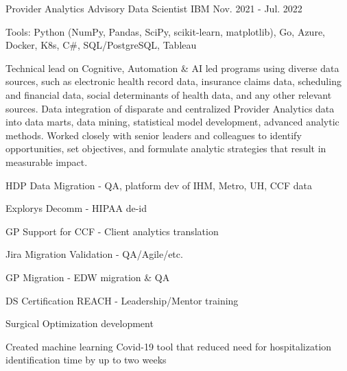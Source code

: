 \begin{cventries}
  \cvexpentry
    {Provider Analytics} %
    {Advisory Data Scientist} %
    {IBM}
    {Nov. 2021 - Jul. 2022}
    {
      \begin{cvheavyparagraph}
        Tools: Python (NumPy, Pandas, SciPy, scikit-learn, matplotlib), Go, Azure, Docker, K8s, C\#, SQL/PostgreSQL, Tableau
      \end{cvheavyparagraph}
    }
    {
      \begin{cvparagraph}
        Technical lead on Cognitive, Automation \& AI led programs using diverse data sources, such as electronic health record data, insurance claims data, scheduling and financial data, social determinants of health data, and any other relevant sources.  Data integration of disparate and centralized Provider Analytics data into data marts, data mining, statistical model development, advanced analytic methods.  Worked closely with senior leaders and colleagues to identify opportunities, set objectives, and formulate analytic strategies that result in measurable impact.
      \end{cvparagraph}
      \begin{cvitems}
        \item {HDP Data Migration - QA, platform dev of IHM, Metro, UH, CCF data}
        \item {Explorys Decomm - HIPAA de-id}
        \item {GP Support for CCF - Client analytics translation}
        \item {Jira Migration Validation - QA/Agile/etc.}
        \item {GP Migration - EDW migration \& QA}
        \item {DS Certification REACH - Leadership/Mentor training}
        \item {Surgical Optimization development}
        \item {Created machine learning Covid-19 tool that reduced need for hospitalization identification time by up to two weeks}
      \end{cvitems}
    }


\end{cventries}
